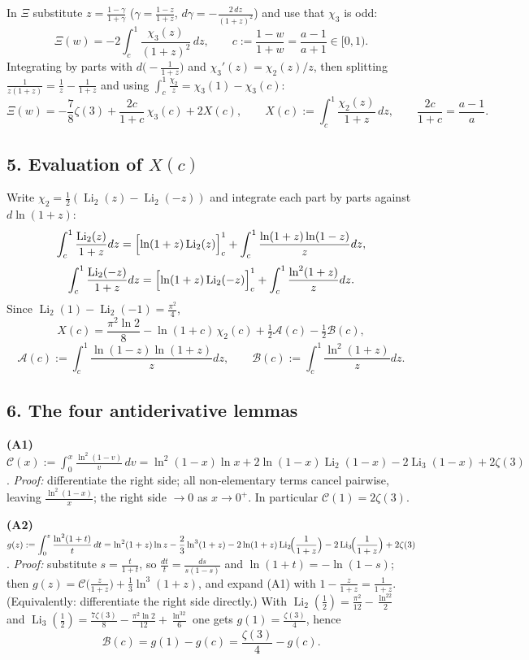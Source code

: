 \documentclass[11pt]{article}
\theoremstyle{remark}
\begin{document}
In $\Xi$ substitute $z=\frac{1-\gamma}{1+\gamma}$ ($\gamma=\frac{1-z}{1+z}$, $d\gamma=-\frac{2\,dz}{(1+z)^2}$) and use that $\chi_3$ is odd:
\[\Xi(w)=-2\int_{c}^{1}\frac{\chi_3(z)}{(1+z)^2}\,dz,\qquad
c:=\frac{1-w}{1+w}=\frac{a-1}{a+1}\in[0,1).\]
Integrating by parts with $d\bigl(-\frac1{1+z}\bigr)$ and $\chi_3'(z)=\chi_2(z)/z$, then splitting $\frac{1}{z(1+z)}=\frac1z-\frac1{1+z}$ and using $\int_c^1\frac{\chi_2}{z}=\chi_3(1)-\chi_3(c)$:
\begin{equation}
\Xi(w)=-\frac78\zeta(3)+\frac{2c}{1+c}\,\chi_3(c)+2X(c),
\qquad X(c):=\int_c^1\frac{\chi_2(z)}{1+z}\,dz,\qquad \frac{2c}{1+c}=\frac{a-1}{a}. \tag{4.2}
\end{equation}

\subsection*{5. Evaluation of $X(c)$}

Write $\chi_2=\frac12(\operatorname{Li}_2(z)-\operatorname{Li}_2(-z))$ and integrate each part by parts against $d\ln(1+z)$:
\[\int_c^1\frac{\operatorname{Li}_2(z)}{1+z}dz=\Bigl[\ln(1+z)\operatorname{Li}_2(z)\Bigr]_c^1+\int_c^1\frac{\ln(1+z)\ln(1-z)}{z}dz,\]
\[\int_c^1\frac{\operatorname{Li}_2(-z)}{1+z}dz=\Bigl[\ln(1+z)\operatorname{Li}_2(-z)\Bigr]_c^1+\int_c^1\frac{\ln^2(1+z)}{z}dz .\]
Since $\operatorname{Li}_2(1)-\operatorname{Li}_2(-1)=\frac{\pi^2}{4}$,
\begin{equation}
X(c)=\frac{\pi^2\ln2}{8}-\ln(1+c)\,\chi_2(c)+\tfrac12\mathcal A(c)-\tfrac12\mathcal B(c), \tag{5.1}
\end{equation}
\[\mathcal A(c):=\int_c^1\frac{\ln(1-z)\ln(1+z)}{z}dz,\qquad
\mathcal B(c):=\int_c^1\frac{\ln^2(1+z)}{z}dz .\]

\subsection*{6. The four antiderivative lemmas}

\textbf{(A1)} $\displaystyle \mathcal C(x):=\int_0^x\frac{\ln^2(1-v)}{v}\,dv
=\ln^2(1-x)\ln x+2\ln(1-x)\operatorname{Li}_2(1-x)-2\operatorname{Li}_3(1-x)+2\zeta(3)$.
\emph{Proof:} differentiate the right side; all non-elementary terms cancel pairwise, leaving $\frac{\ln^2(1-x)}{x}$; the right side $\to0$ as $x\to0^+$. In particular $\mathcal C(1)=2\zeta(3)$.

\textbf{(A2)} $\displaystyle g(z):=\int_0^z\frac{\ln^2(1+t)}{t}\,dt
=\ln^2(1+z)\ln z-\frac23\ln^3(1+z)-2\ln(1+z)\operatorname{Li}_2\!\Bigl(\frac1{1+z}\Bigr)-2\operatorname{Li}_3\!\Bigl(\frac1{1+z}\Bigr)+2\zeta(3)$.
\emph{Proof:} substitute $s=\frac{t}{1+t}$, so $\frac{dt}{t}=\frac{ds}{s(1-s)}$ and $\ln(1+t)=-\ln(1-s)$; then
$g(z)=\mathcal C\bigl(\frac{z}{1+z}\bigr)+\frac13\ln^3(1+z)$, and expand (A1) with $1-\frac{z}{1+z}=\frac1{1+z}$. (Equivalently: differentiate the right side directly.)
With $\operatorname{Li}_2(\tfrac12)=\frac{\pi^2}{12}-\frac{\ln^22}{2}$ and $\operatorname{Li}_3(\tfrac12)=\frac{7\zeta(3)}{8}-\frac{\pi^2\ln2}{12}+\frac{\ln^32}{6}$ one gets $g(1)=\frac{\zeta(3)}{4}$, hence
\begin{equation}
\mathcal B(c)=g(1)-g(c)=\frac{\zeta(3)}{4}-g(c). \tag{6.1}
\end{equation}
\end{document}
